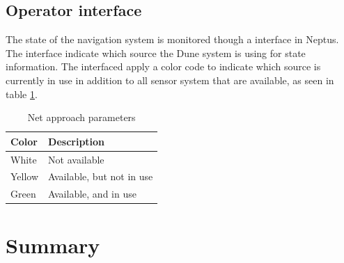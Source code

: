 \subsection{Operator interface}
The state of the navigation system is monitored though a interface in Neptus. The interface indicate which source the Dune system is using for state information. The interfaced apply a color code to indicate which source is currently in use in addition to all sensor system that are available, as seen in table \ref{Tb:Color Code}.
\begin{table}[H]
\begin{center}
    \begin{tabular}{ | l | l |}
    \hline
    \textbf{Color} & \textbf{Description} \\ \hline
    White & Not available \\ \hline
    Yellow & Available, but not in use \\ \hline
    Green & Available, and in use \\ \hline
    \end{tabular}
\end{center}
\caption{Net approach parameters }
\label{Tb:Color Code}
\end{table}

\section{Summary}